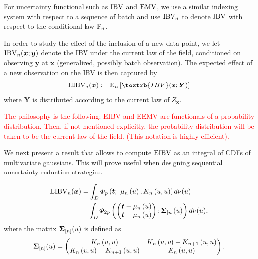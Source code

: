 \documentclass[aoas]{imsart}
\begin{document}
For uncertainty functional such as $\mathrm{IBV}$ and $\mathrm{EMV}$, we use a similar indexing system
with respect to a sequence of batch and use $\operatorname{IBV}_{n}$ to denote $\operatorname{IBV}$ with respect to the conditional law $\mathbb{P}_{n}$.

\medskip

In order to study the effect of the inclusion of a new data point, we let
$
\operatorname{IBV}_{n}(\bm{x}; \bm{y})
$
denote the IBV under the current law of the field, conditioned on observing $\bm{y}$ at $\bm{x}$ (generalized, possibly batch observation). The expected effect of a new observation on the IBV is then captured by
\begin{equation}\label{def:eibv}
    \currentEIBV(\bm{x}):=\mathbb{E}_{\stage}\left[\textrb{IBV}(\bm{x}; \bm{Y})\right]
\end{equation}
where $\bm{Y}$ is distributed according to the current law of $Z_{\bm{x}}$.


\textcolor{red}{
The philosophy is the following: EIBV and EEMV are functionals of a probability distribution. Then, if not mentioned explicitly, the probability distribution will be taken to be the current law of the field. (This notation is highly efficient).}


We next present a result that allows to compute $\operatorname{EIBV}$ as an integral of CDFs of multivariate gaussians. This will prove useful when designing sequential uncertainty reduction strategies.

\begin{propo}
\label{propo_eibv}
\begin{equation}
\begin{split}
\currentEIBV(\bm{x})
&=\int_{D} \varPhi_{\no}\left(\bt;~\currentMean{\uu}, \currentCov{u, u}\right) d\mes(u)\\
&-\int_{D} \varPhi_{2\no}
\left(
\left(
\begin{matrix}
\bt-\currentMean{u}\\
\bt-\currentMean{u}
\end{matrix}
\right);
\mathbf{\Sigma}_{[n]}(\uu)
\right)
d\mes(u),
\end{split}
\end{equation}
where the matrix $\mathbf{\Sigma}_{[n]}(u)$ is defined as
\begin{equation*}
\begin{split}
\mathbf{\Sigma}_{[n]}(\uu)&=
\left(
\begin{matrix}
\currentCov{u, u} & \currentCov{u, u}-\futureCov{u, u}\\
\currentCov{u, u}-\futureCov{u, u} & \currentCov{u, u}
\end{matrix}
\right).\\
\end{split}
\end{equation*}
\end{propo}
\end{document}
